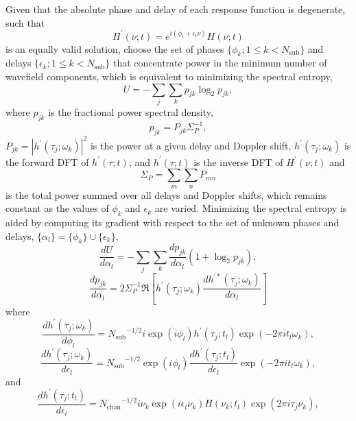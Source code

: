 \documentclass[manuscript]{aastex631}
\newcommand{\Nsub}{\ensuremath{N_\mathrm{sub}}}
\newcommand{\Nchan}{\ensuremath{N_\mathrm{chan}}}
\begin{document}
Given that the absolute phase and delay of each response function is degenerate, such that
%
$$H^\prime(\nu;t) = e^{i(\phi_t + \epsilon_t\nu)} H(\nu;t)$$ 
%
is an equally valid
solution, choose the set of phases $\{ \phi_k; 1 \le k < \Nsub\}$ and delays $\{ \epsilon_k; 1 \le k < \Nsub\}$ that concentrate power in the minimum
number of wavefield components, which is equivalent to minimizing the spectral entropy,
%
\begin{equation}
U = - \sum_j \sum_k p_{jk} \log_2 p_{jk},
\end{equation}
where $p_{jk}$ is the fractional power spectral density,
\begin{equation}
p_{jk} = P_{jk} \Sigma_P^{-1},
\end{equation}
$P_{jk} = | h^\prime(\tau_j;\omega_k) |^2$ is the power at a
given delay and Doppler shift, 
$h^\prime(\tau_j;\omega_k)$ is the forward DFT of $h^\prime(\tau;t)$,
and $h^\prime(\tau;t)$ is the inverse DFT of $H^\prime(\nu;t)$
and
%
\begin{equation}
\Sigma_P =  \sum_m \sum_n P_{mn}
\end{equation}
%
is the total power summed over all delays and Doppler shifts, which remains constant as the values of $\phi_k$ and $\epsilon_k$ are varied.
%
Minimizing the spectral entropy is aided by computing its
gradient with respect to the set of unknown phases and delays,
$\{\alpha_l\} = \{\phi_k\} \cup \{\epsilon_k\}$,
%
\begin{equation}
\frac{dU}{d\alpha_l} = - \sum_j \sum_k \frac{dp_{jk}}{d\alpha_l} \left(1+\log_2 p_{jk} \right),
\end{equation}
%
\begin{equation}
\frac{dp_{jk}}{d\alpha_l} 
= 2 \Sigma_P^{-1} \Re\left[ h^\prime(\tau_j;\omega_k) \frac{dh^{\prime*}(\tau_j;\omega_k)}{d\alpha_l} \right]
     \label{eqn:dp_dphi}
\end{equation}
%
where
%
\begin{equation} \label{eqn:dh_tau_omega_dphi}
\frac{dh^\prime(\tau_j;\omega_k)}{d\phi_l} 
  = \Nsub^{-1/2} i \exp(i\phi_l) h^\prime(\tau_j; t_l) \exp(- 2\pi i t_l \omega_k),
\end{equation}
%
\begin{equation} \label{eqn:dh_tau_omega_depsilon}
\frac{dh^\prime(\tau_j;\omega_k)}{d\epsilon_l}
  = \Nsub^{-1/2} \exp(i\phi_l) \frac{dh^\prime(\tau_j; t_l)}{d\epsilon_l}\exp(- 2\pi i t_l \omega_k),
\end{equation}
%
and
\begin{equation} \label{eqn:dh_tau_t_depsilon} 
\frac{dh^\prime(\tau_j;t_l)}{d\epsilon_l}
  = \Nchan^{-1/2} i \nu_k \exp(i\epsilon_l\nu_k) H(\nu_k; t_l) \exp(2\pi i \tau_j \nu_k),
\end{equation}
\end{document}
